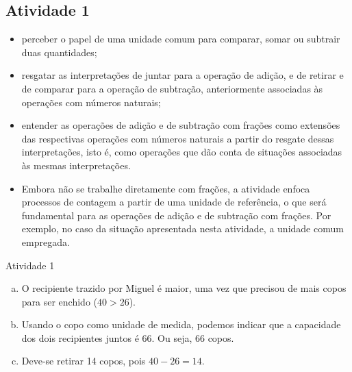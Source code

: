 \begin{multicols}{2}
\subsection{Atividade 1}

\vspace{.15cm}

\begin{itemize} %
  \item     perceber o papel de uma unidade comum para comparar, somar ou subtrair duas quantidades;
  \item     resgatar as interpretações de juntar para a operação de adição, e de retirar e de comparar para a operação de subtração, anteriormente associadas às operações com números naturais;
  \item     entender as operações de adição e de subtração com frações como extensões das respectivas operações com números naturais a partir do resgate dessas interpretações, isto é, como operações que dão conta de situações associadas às mesmas interpretações.
\end{itemize} %


 \vspace{.15cm}
\begin{itemize} %
  \item     Embora não se trabalhe diretamente com frações, a atividade enfoca processos de contagem a partir de uma unidade de referência, o que será fundamental para as operações de adição e de subtração com frações. Por exemplo, no caso da situação apresentada nesta atividade, a unidade comum empregada.
\end{itemize} %


\begin{resposta*}{Atividade 1}
 \begin{enumerate}[a)]
  \item O recipiente trazido por Miguel é maior, uma vez que precisou de mais copos para ser enchido ($40>26$).
  \item Usando o copo como unidade de medida, podemos indicar que a capacidade dos dois recipientes juntos é 66. Ou seja, 66 copos.
  \item Deve-se retirar 14 copos, pois $40 - 26=14$.
 \end{enumerate}

\end{resposta*}



\end{multicols}
